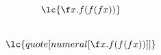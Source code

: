 \documentclass[12pt]{article}
\begin{document}
\[\lc{\f x.f(f(f x))}\]\\

\[\lc{quote[numeral[\f x.f(f(f x))]]}\]
\end{document}
